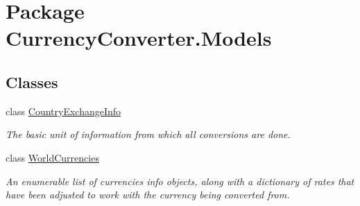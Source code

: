 \hypertarget{namespace_currency_converter_1_1_models}{\section{Package Currency\-Converter.\-Models}
\label{namespace_currency_converter_1_1_models}
}
\subsection*{Classes}
\begin{DoxyCompactItemize}
\item 
class \hyperlink{class_currency_converter_1_1_models_1_1_country_exchange_info}{Country\-Exchange\-Info}
\begin{DoxyCompactList}\small\item\em The basic unit of information from which all conversions are done. \end{DoxyCompactList}\item 
class \hyperlink{class_currency_converter_1_1_models_1_1_world_currencies}{World\-Currencies}
\begin{DoxyCompactList}\small\item\em An enumerable list of currencies info objects, along with a dictionary of rates that have been adjusted to work with the currency being converted from. \end{DoxyCompactList}\end{DoxyCompactItemize}
